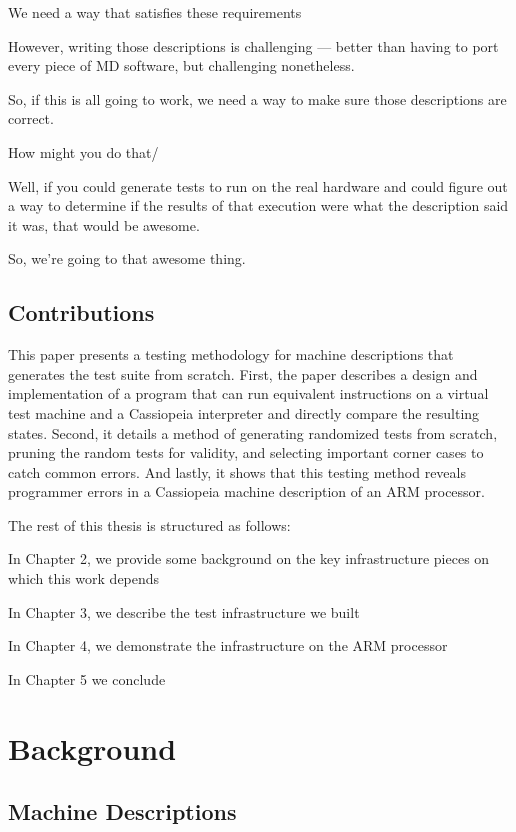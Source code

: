 \documentclass[letterpaper,12pt]{article}
\begin{document}
We need a way that satisfies these requirements

However, writing those descriptions is challenging — better than having to port every piece of MD software, but challenging nonetheless.

So, if this is all going to work, we need a way to make sure those descriptions are correct.

How might you do that/

Well, if you could generate tests to run on the real hardware and could figure out a way to determine if the results of that execution were what the description said it was, that would be awesome.

So, we’re going to that awesome thing.

\subsection{Contributions}

This paper presents a testing methodology for machine descriptions that generates the test suite from scratch. First, the paper describes a design and implementation of a program that can run equivalent instructions on a virtual test machine and a Cassiopeia interpreter and directly compare the resulting states. Second, it details a method of generating randomized tests from scratch, pruning the random tests for validity, and selecting important corner cases to catch common errors. And lastly, it shows that this testing method reveals programmer errors in a Cassiopeia machine description of an ARM processor.

The rest of this thesis is structured as follows:

In Chapter 2, we provide some background on the key infrastructure pieces on which this work depends

In Chapter 3, we describe the test infrastructure we built

In Chapter 4, we demonstrate the infrastructure on the ARM processor

In Chapter 5 we conclude

\section{Background}
\subsection{Machine Descriptions}
\end{document}
